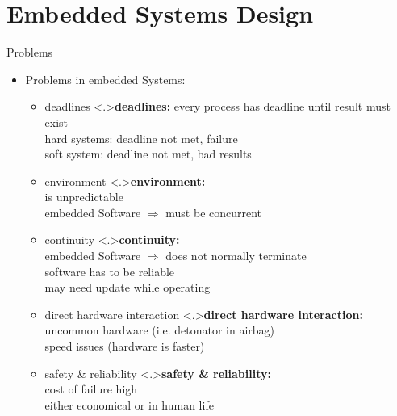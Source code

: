 \documentclass[ngerman={babel}, utf8, bigger, t, xcolor={table,dvipsnames}, ompress, hyperref={bookmarks,colorlinks}]{beamer}
\begin{document}
\section{Embedded Systems Design}
\begin{frame}{Problems}
	\begin{itemize}
		\item Problems in embedded Systems:
		\begin{itemize}
			\item deadlines
			\note<.>{\textbf{deadlines:} every process has deadline until result must exist \\ hard systems: deadline not met, failure\\ soft system: deadline not met, bad results}
			\item environment
			\note<.>{\textbf{environment:}\\ is unpredictable \\ embedded Software $\Rightarrow$ must be concurrent}
			\item continuity
			\note<.>{\textbf{continuity:}\\ embedded Software $\Rightarrow$ does not normally terminate \\ software has to be reliable \\ may need update while operating}
			\item direct hardware interaction
			\note<.>{\textbf{direct hardware interaction:}\\ uncommon hardware (i.e. detonator in airbag) \\ speed issues (hardware is faster)}
			\item safety \& reliability
			\note<.>{\textbf{safety \& reliability:}\\ cost of failure high \\ either economical or in human life}
		\end{itemize}
	\end{itemize}
\end{frame}
\end{document}
